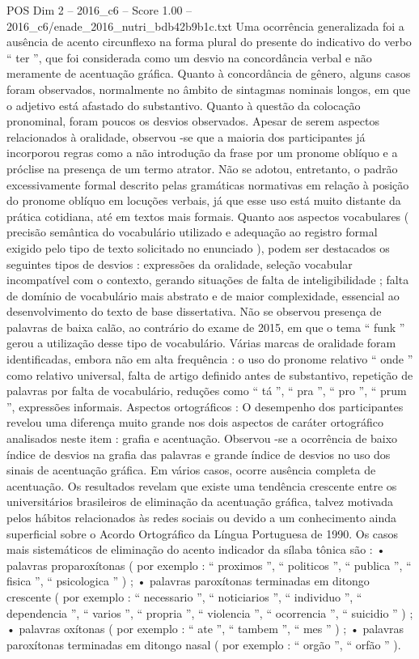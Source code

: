 \begin{textsample}{POS Dim 2 – 2016\_c6 – Score 1.00 – 2016\_c6/enade\_2016\_nutri\_bdb42b9b1c.txt}
Uma ocorrência generalizada foi a ausência de acento circunflexo na forma plural do presente do indicativo do verbo “ ter ”, que foi considerada como um desvio na concordância verbal e não meramente de acentuação gráfica.
Quanto à concordância de gênero, alguns casos foram observados, normalmente no âmbito de sintagmas nominais longos, em que o adjetivo está afastado do substantivo.
Quanto à questão da colocação pronominal, foram poucos os desvios observados.
Apesar de serem aspectos relacionados à oralidade, observou -se que a maioria dos participantes já incorporou regras como a não introdução da frase por um pronome oblíquo e a próclise na presença de um termo atrator.
Não se adotou, entretanto, o padrão excessivamente formal descrito pelas gramáticas normativas em relação à posição do pronome oblíquo em locuções verbais, já que esse uso está muito distante da prática cotidiana, até em textos mais formais.
Quanto aos aspectos vocabulares ( precisão semântica do vocabulário utilizado e adequação ao registro formal exigido pelo tipo de texto solicitado no enunciado ), podem ser destacados os seguintes tipos de desvios : expressões da oralidade, seleção vocabular incompatível com o contexto, gerando situações de falta de inteligibilidade ; falta de domínio de vocabulário mais abstrato e de maior complexidade, essencial ao desenvolvimento do texto de base dissertativa.
Não se observou presença de palavras de baixa calão, ao contrário do exame de 2015, em que o tema “ funk ” gerou a utilização desse tipo de vocabulário.
Várias marcas de oralidade foram identificadas, embora não em alta frequência : o uso do pronome relativo “ onde ” como relativo universal, falta de artigo definido antes de substantivo, repetição de palavras por falta de vocabulário, reduções como “ tá ”, “ pra ”, “ pro ”, “ prum ”, expressões informais.
Aspectos ortográficos : O desempenho dos participantes revelou uma diferença muito grande nos dois aspectos de caráter ortográfico analisados neste item : grafia e acentuação.
Observou -se a ocorrência de baixo índice de desvios na grafia das palavras e grande índice de desvios no uso dos sinais de acentuação gráfica.
Em vários casos, ocorre ausência completa de acentuação.
Os resultados revelam que existe uma tendência crescente entre os universitários brasileiros de eliminação da acentuação gráfica, talvez motivada pelos hábitos relacionados às redes sociais ou devido a um conhecimento ainda superficial sobre o Acordo Ortográfico da Língua Portuguesa de 1990.
Os casos mais sistemáticos de eliminação do acento indicador da sílaba tônica são : • palavras proparoxítonas ( por exemplo : “ proximos ”, “ politicos ”, “ publica ”, “ fisica ”, “ psicologica ” ) ; • palavras paroxítonas terminadas em ditongo crescente ( por exemplo : “ necessario ”, “ noticiarios ”, “ individuo ”, “ dependencia ”, “ varios ”, “ propria ”, “ violencia ”, “ ocorrencia ”, “ suicidio ” ) ; • palavras oxítonas ( por exemplo : “ ate ”, “ tambem ”, “ mes ” ) ; • palavras paroxítonas terminadas em ditongo nasal ( por exemplo : “ orgão ”, “ orfão ” ).

\end{textsample}
